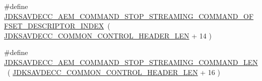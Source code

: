 \begin{DoxyCompactItemize}
\#define \hyperlink{group__command__stop__streaming_gaec5ae954948db9f2a5aab3afd5b7dea4}{J\+D\+K\+S\+A\+V\+D\+E\+C\+C\+\_\+\+A\+E\+M\+\_\+\+C\+O\+M\+M\+A\+N\+D\+\_\+\+S\+T\+O\+P\+\_\+\+S\+T\+R\+E\+A\+M\+I\+N\+G\+\_\+\+C\+O\+M\+M\+A\+N\+D\+\_\+\+O\+F\+F\+S\+E\+T\+\_\+\+D\+E\+S\+C\+R\+I\+P\+T\+O\+R\+\_\+\+I\+N\+D\+EX}~( \hyperlink{group__jdksavdecc__avtp__common__control__header_gaae84052886fb1bb42f3bc5f85b741dff}{J\+D\+K\+S\+A\+V\+D\+E\+C\+C\+\_\+\+C\+O\+M\+M\+O\+N\+\_\+\+C\+O\+N\+T\+R\+O\+L\+\_\+\+H\+E\+A\+D\+E\+R\+\_\+\+L\+EN} + 14 )
\item 
\#define \hyperlink{group__command__stop__streaming_ga37e2bec2217af78aed138bbf254234d0}{J\+D\+K\+S\+A\+V\+D\+E\+C\+C\+\_\+\+A\+E\+M\+\_\+\+C\+O\+M\+M\+A\+N\+D\+\_\+\+S\+T\+O\+P\+\_\+\+S\+T\+R\+E\+A\+M\+I\+N\+G\+\_\+\+C\+O\+M\+M\+A\+N\+D\+\_\+\+L\+EN}~( \hyperlink{group__jdksavdecc__avtp__common__control__header_gaae84052886fb1bb42f3bc5f85b741dff}{J\+D\+K\+S\+A\+V\+D\+E\+C\+C\+\_\+\+C\+O\+M\+M\+O\+N\+\_\+\+C\+O\+N\+T\+R\+O\+L\+\_\+\+H\+E\+A\+D\+E\+R\+\_\+\+L\+EN} + 16 )
\end{DoxyCompactItemize}
